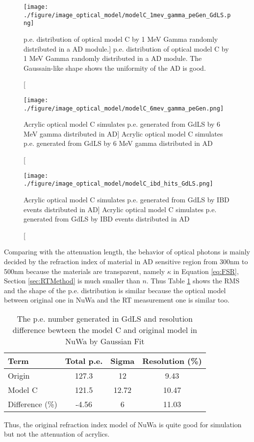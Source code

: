 \begin{figure}
    \centering
    \label{fig:modelC_1mev_gamma_peGen_GdLS.png}
    \texttt{[image: ./figure/image\_optical\_model/modelC\_1mev\_gamma\_peGen\_GdLS.png]}
    \caption
[p.e. distribution of optical model C by 1 MeV Gamma randomly distributed in a AD module.]
{p.e. distribution of optical model C by 1 MeV Gamma randomly distributed in a AD module. The Gaussain-like shape shows the uniformity of the AD is good.}
    \end{figure}

\begin{figure}
    \centering
    \texttt{[image: ./figure/image\_optical\_model/modelC\_6mev\_gamma\_peGen.png]}
    \caption
    [Acrylic optical model C simulates p.e. generated from GdLS by 6 MeV gamma distributed in AD]
    {Acrylic optical model C simulates p.e. generated from GdLS by 6 MeV gamma distributed in AD}
    \label{fig:modelC_6mev_gamma_peGen.png}
    \end{figure}



\begin{figure}
    \centering
    \texttt{[image: ./figure/image\_optical\_model/modelC\_ibd\_hits\_GdLS.png]}
    \caption
    [Acrylic optical model C simulates p.e. generated from GdLS by IBD events distributed in AD]
    {Acrylic optical model C simulates p.e. generated from GdLS by IBD events distributed in AD}
    \label{fig:modelC_6mev_gamma_peGen.png}
    \end{figure}


Comparing with the attenuation length, the behavior of optical photons is mainly decided by the refraction index of material in AD sensitive
region from 300nm to 500nm because the materials are transparent, namely $\kappa$ in Equation \ref{eq:FSR}, Section \ref{sec:RTMethod}
is much smaller than $n$. Thus Table \ref{tab:peGenGdLSEER} shows the RMS
and the shape of the p.e. distribution is similar
because the optical model between original one in NuWa and the RT measurement one is similar too.


\begin{table}
\centering
\caption{The p.e. number generated in GdLS and resolution difference bewteen the model C and original model in NuWa by Gaussian Fit}
\label{tab:peGenGdLSEER}
\begin{tabular}{lccc}
Term & Total p.e. & Sigma & Resolution (\%) \\
\hline
\hline
Origin      & 127.3     & 12    & 9.43 \\
Model C     & 121.5     & 12.72 & 10.47 \\
\hline
Difference (\%) & -4.56 & 6     & 11.03 \\
\hline
\end{tabular}
\end{table}


Thus, the original refraction index model of NuWa is quite good for simulation but not the attenuation of acrylics.


